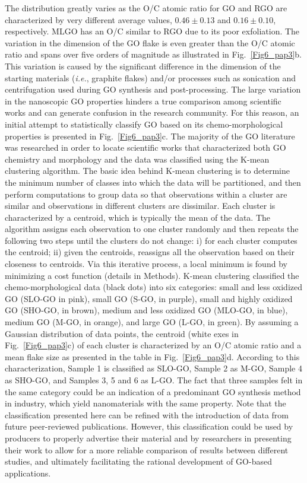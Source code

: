 The distribution greatly varies as the O/C atomic ratio for GO and RGO are characterized by very different average values, $0.46\pm0.13$ and $0.16\pm0.10$, respectively. MLGO has an O/C similar to RGO due to its poor exfoliation. The variation in the dimension of the GO flake is even greater than the O/C atomic ratio and spans over five orders of magnitude as illustrated in Fig.~\ref{Fig6_pap3}b. This variation is caused by the significant difference in the dimension of the starting materials (\textit{i.e.}, graphite flakes)\cite{zhao2010efficient} and/or processes such as sonication and centrifugation used during GO synthesis and post-processing.\cite{amadei2016fabrication,Goncalves2014,khan2012size,lin2012fabrication} The large variation in the nanoscopic GO properties hinders a true comparison among scientific works and can generate confusion in the research community. For this reason, an initial attempt to statistically classify GO based on its chemo-morphological properties is presented in Fig.~\ref{Fig6_pap3}c. The majority of the GO literature was researched in order to locate scientific works that characterized both GO chemistry and morphology and the data was classified using the K-mean clustering algorithm.\cite{bishop2006pattern} The basic idea behind K-mean clustering is to determine the minimum number of classes into which the data will be partitioned, and then perform computations to group data so that observations within a cluster are similar and observations in different clusters are dissimilar. Each cluster is characterized by a centroid, which is typically the mean of the data. The algorithm assigns each observation to one cluster randomly and then repeats the following two steps until the clusters do not change: i) for each cluster computes the centroid; ii) given the centroids, reassigns all the observation based on their closeness to centroids. Via this iterative process, a local minimum is found by minimizing a cost function (details in Methods). K-mean clustering classified the chemo-morphological data (black dots) into six categories: small and less oxidized GO (SLO-GO in pink), small GO (S-GO, in purple), small and highly oxidized GO (SHO-GO, in brown), medium and less oxidized GO (MLO-GO, in blue), medium GO (M-GO, in orange), and large GO (L-GO, in green). By assuming a Gaussian distribution of data points, the centroid (white exes in Fig.~\ref{Fig6_pap3}c) of each cluster is characterized by an O/C atomic ratio and a mean flake size as presented in the table in Fig.~\ref{Fig6_pap3}d. According to this characterization, Sample 1 is classified as SLO-GO, Sample 2 as M-GO, Sample 4 as SHO-GO, and Samples 3, 5 and 6 as L-GO. The fact that three samples felt in the same category could be an indication of a predominant GO synthesis method in industry, which yield nanomaterials with the same property. Note that the classification presented here can be refined with the introduction of data from future peer-reviewed publications. However, this classification could be used by producers to properly advertise their material and by researchers in presenting their work to allow for a more reliable comparison of results between different studies, and ultimately facilitating the rational development of GO-based applications.

